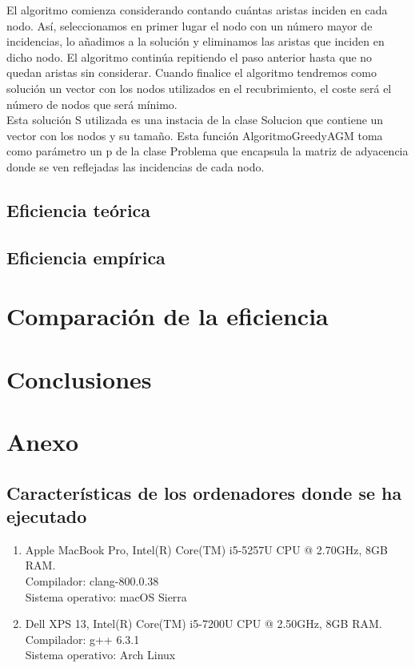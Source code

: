 \documentclass[11pt]{article}
\begin{document}
El algoritmo comienza considerando contando cuántas aristas inciden en cada nodo. Así, seleccionamos en primer lugar el nodo con un número mayor de incidencias, lo añadimos a la solución y eliminamos las aristas que inciden en dicho nodo. El algoritmo continúa repitiendo el paso anterior hasta que no quedan aristas sin considerar. Cuando finalice el algoritmo tendremos como solución un vector con los nodos utilizados en el recubrimiento, el coste será el número de nodos que será mínimo.\\



Esta solución S utilizada es una instacia de la clase Solucion que contiene un vector con los nodos y su tamaño.
Esta función AlgoritmoGreedyAGM toma como parámetro un p de la clase Problema que encapsula la matriz de adyacencia donde se ven reflejadas las incidencias de cada nodo.

\subsection*{Eficiencia teórica}


\subsection*{Eficiencia empírica}


\section*{Comparación de la eficiencia}


\section*{Conclusiones}


\newpage

\section*{Anexo}
\subsection*{Características de los ordenadores donde se ha ejecutado}

\vspace{0.5em}

\begin{enumerate}
\item Apple MacBook Pro, Intel(R) Core(TM) i5-5257U CPU @ 2.70GHz, 8GB RAM.\\  Compilador: clang-800.0.38 \\
  Sistema operativo: macOS Sierra
\item Dell XPS 13, Intel(R) Core(TM) i5-7200U CPU @ 2.50GHz, 8GB RAM.\\
  Compilador: g++ 6.3.1\\
  Sistema operativo: Arch Linux
\end{enumerate}
\end{document}
